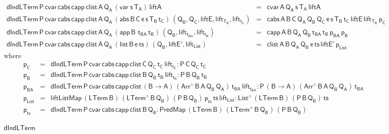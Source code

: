 \documentclass[sigplan,screen]{acmart}
\begin{document}
\begin{figure*}[t]

    \begin{adjustbox}{varwidth=7.3in, max width=7.1in, margin=-0.0in 0in
      -0.2in 0in, center} 
  
{\small
\[\begin{array}{lll}
\mathsf{dIndLTerm \, P\, cvar \, cabs\, capp\, clist \, A\, Q_A\,
  (var\;s\,T_A) \, liftA} & = & \mathsf{cvar \, A\, Q_A\, s\, T_A\,
  liftA}\\ 
\mathsf{dIndLTerm \, P\, cvar \, cabs\, capp\, clist \, A\, Q_A\,
  (abs \,B \,C \,e \,s \,T_B \, t_C) \, (Q_B , Q_C , liftE,
  lift_{T_B}, lift_{t_C})} & = & \mathsf{cabs\,A\,B\,C\, Q_A\,
  Q_B\, Q_C\, e\, s\, T_B\, t_C\, liftE\, lift_{T_B}\, p_C}\\
\mathsf{dIndLTerm \, P\, cvar \, cabs\, capp\, clist \, A\, Q_A\,
    (app \,B \,\,t_{BA} \, t_B)\, (Q_B , lift_{t_{BA}}, lift_{t_B})} &
= & \mathsf{capp\,A\,B\,Q_A\, Q_B\, t_{BA}\, t_B\, p_{BA} \, p_B}\\
  \mathsf{dIndLTerm \, P\, cvar \, cabs\, capp\, clist \, A\, Q_A\,
    (list \,B \,e \, ts) \, (Q_B , liftE', lift_{List})} & = & 
  \mathsf{clist \,A\,B\,Q_A\, Q_B\, e\, ts\, liftE'\, p_{List} }
\end{array}\]}
\mbox{where}
{\small
\[\begin{array}{lll}
\mathsf{p_C} & = & \mathsf{dIndLTerm\,P\,cvar\,cabs \,capp \,clist\,
  C\, Q_C\, t_C\, lift_{t_C} : P \, C\, Q_C \, t_C }\\
\mathsf{p_B} & = & \mathsf{dIndLTerm\,P\,cvar\,cabs \,capp \,clist\,
  B\, Q_B\, t_B\, lift_{t_B} : P \, B\, Q_B \, t_B }\\
\mathsf{p_{BA}} & = & \mathsf{dIndLTerm\,P\,cvar\,cabs \,capp
  \,clist\, (B \to A)\,(Arr^{\wedge} \, B\, A\, Q_B \, Q_A) \,
  t_{BA}\, lift_{t_{BA}} : P \, (B \to A)\, (Arr^{\wedge} \, B\, A\,
  Q_B \, Q_A) \, t_{BA}}\\ 
\mathsf{p_{List}} & = &\mathsf{liftListMap \, (LTerm\, B) \,
  (LTerm^{\wedge} \, B \, Q_B)\, (P\,B\,Q_B)\, p_{ts} \, ts\,
  lift_{List} : List^{\wedge}\, (LTerm\,B) \, (P\,B\,Q_B) \, ts}\\
\mathsf{p_{ts}} & = & \mathsf{dIndLTerm\, P\, cvar\, cabs\, capp\,
  clist\, B\, Q_B : PredMap\,(LTerm\,B) \,(LTerm^{\wedge}\, B\, Q_B)
  \, (P\,B\,Q_B)}
\end{array}\]}

\vspace*{-0.1in}

\caption{$\mathsf{dIndLTerm}$}\label{fig:dindlterm} \vspace*{0.1in} 
\end{adjustbox}
\end{figure*}
\end{document}
